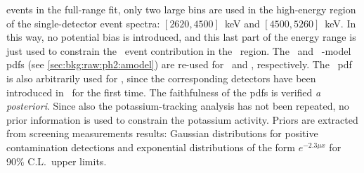 events in the full-range fit, only two large bins are used in the high-energy region of
the single-detector event spectra: $[2620, 4500]$~keV and $[4500, 5260]$~keV. In this way,
no potential bias is introduced, and this last part of the energy range is just used to
constrain the \a\ event contribution in the \nnbb\ region. The \enrBEGeII\ and \enrCoaxII\
\a-model pdfs (see \cref{sec:bkg:raw:ph2:amodel}) are re-used for \enrBEGeIIp\ and
\enrSCoaxIIp, respectively. The \enrBEGeII\ pdf is also arbitrarily used for \enrICoaxIIp,
since the corresponding detectors have been introduced in \phasetwop\ for the first time.
The faithfulness of the pdfs is verified \emph{a posteriori}.
\newpar
Since also the potassium-tracking analysis has not been repeated, no prior information is
used to constrain the potassium activity. Priors are extracted from screening
measurements results: Gaussian distributions for positive contamination detections and
exponential distributions of the form $e^{-2.3 \mu x}$ for 90\% C.L.~upper limits.

